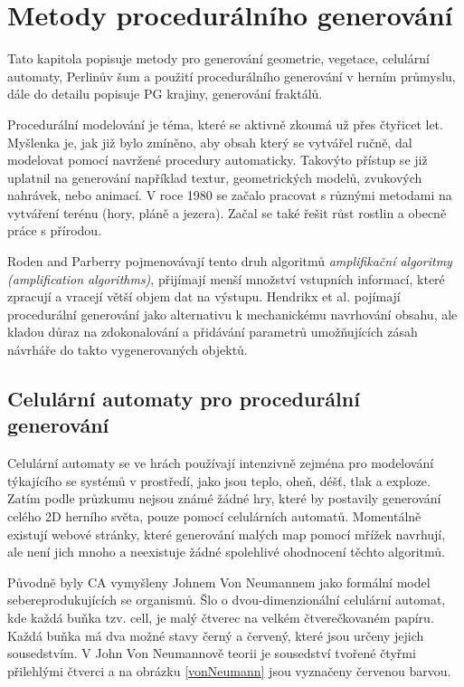 \chapter{Metody procedurálního generování}
\label{procedural}
Tato kapitola popisuje metody pro generování geometrie, vegetace, celulární automaty, Perlinův šum a použití procedurálního generování v herním průmyslu, dále do detailu popisuje PG krajiny, generování fraktálů.

Procedurální modelování je téma, které se aktivně zkoumá už přes čtyřicet let. Myšlenka je, jak již bylo zmíněno, aby obsah který se vytvářel ručně, dal modelovat pomocí navržené procedury automaticky. Takovýto přístup se již uplatnil na generování například textur, geometrických modelů, zvukových nahrávek, nebo animací. V roce 1980 se začalo pracovat s různými metodami na vytváření terénu (hory, pláně a jezera). Začal se také řešit růst rostlin a obecně práce s přírodou. \cite{inproceedings}

Roden and Parberry \cite{FromArtistry} pojmenovávají tento druh algoritmů \textit{amplifikační algoritmy (amplification algorithms)}, přijímají menší množství vstupních informací, které zpracují a vracejí větší objem dat na výstupu. Hendrikx et al. \cite{Hendrikx} pojímají procedurální generování jako alternativu k mechanickému navrhování obsahu, ale kladou důraz na zdokonalování a přidávání parametrů umožňujících zásah návrháře do takto vygenerovaných objektů.

\section{Celulární automaty pro procedurální generování}
\label{celular}
Celulární automaty se ve hrách používají intenzivně zejména pro modelování týkajícího se systémů v prostředí, jako jsou teplo, oheň, déšť, tlak a exploze. Zatím podle průzkumu nejsou známé žádné hry, které by postavily generování celého 2D herního světa, pouze pomocí celulárních automatů. Momentálně existují webové stránky, které generování malých map pomocí mřížek navrhují, ale není jich mnoho a neexistuje žádné spolehlivé ohodnocení těchto algoritmů. \cite{articleCellular}

Původně byly CA vymyšleny Johnem Von Neumannem jako formální model sebereprodukujících se organismů. Šlo o dvou-dimenzionální celulární automat, kde každá buňka tzv. cell, je malý čtverec na velkém čtverečkovaném papíru. Každá buňka má dva možné stavy černý a červený, které jsou určeny jejich sousedstvím. V John Von Neumannově teorii je sousedství tvořené čtyřmi přilehlými čtverci a na obrázku \ref{vonNeumann} jsou vyznačeny červenou barvou. \cite{Gong2017}

